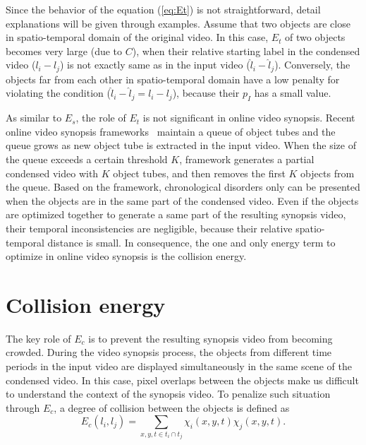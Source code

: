 \documentclass[11pt]{hyu_thesis}
\begin{document}
Since the behavior of the equation (\ref{eq:Et}) is not straightforward, detail explanations will be given through examples. Assume that two objects are close in spatio-temporal domain of the original video. In this case, $E_t$ of two objects becomes very large (due to $C$), when their relative starting label in the condensed video ($l_i - l_j$) is not exactly same as in the input video ($\hat{l}_i - \hat{l}_j$). Conversely, the objects far from each other in spatio-temporal domain have a low penalty for violating the condition ($\hat{l}_i - \hat{l}_j = l_i - l_j$), because their $p_I$ has a small value.

As similar to $E_s$, the role of $E_t$ is not significant in online video synopsis. Recent online video synopsis frameworks~\cite{Fu2014,He2017} maintain a queue of object tubes and the queue grows as new object tube is extracted in the input video. When the size of the queue exceeds a certain threshold $K$, framework generates a partial condensed video with $K$ object tubes, and then removes the first $K$ objects from the queue. Based on the framework, chronological disorders only can be presented when the objects are in the same part of the condensed video. Even if the objects are optimized together to generate a same part of the resulting synopsis video, their temporal inconsistencies are negligible, because their relative spatio-temporal distance is small. In consequence, the one and only energy term to optimize in online video synopsis is the collision energy.

\section{Collision energy}
The key role of $E_c$ is to prevent the resulting synopsis video from becoming crowded. During the video synopsis process, the objects from different time periods in the input video are displayed simultaneously in the same scene of the condensed video. In this case, pixel overlaps between the objects make us difficult to understand the context of the synopsis video. To penalize such situation through $E_c$, a degree of collision between the objects is defined as
\begin{equation}
\label{eq:Ec}
E_c(l_i,l_j)=\sum_{x,y,t \in t_i \cap t_j} \chi_i(x,y,t) \chi_j(x,y,t).
\end{equation}
\end{document}

